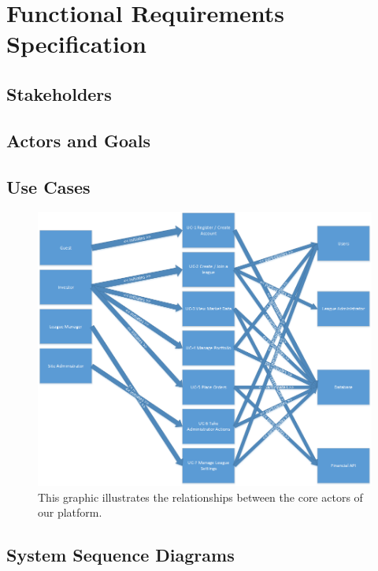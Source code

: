 \chapter{Functional Requirements Specification}


\section{Stakeholders}


\section{Actors and Goals}



\section{Use Cases}


\begin{figure}[H]
\centering
\includegraphics[width=5.5in]{./img/useCase.png}
\caption{This graphic illustrates the relationships between the core actors of our platform.}
\end{figure}

\section{System Sequence Diagrams}


